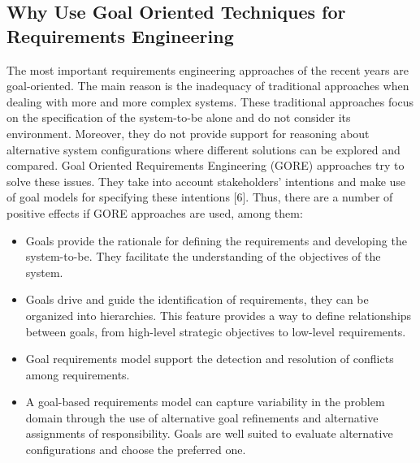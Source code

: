 \documentclass[10pt, conference, compsocconf]{IEEEtran}
\def\kaos{\textsc{Kaos}}
\begin{document}
\subsection{Why Use Goal Oriented Techniques for Requirements Engineering}

The most important requirements engineering approaches of the recent years are goal-oriented. The main reason is the inadequacy of traditional approaches when dealing with more and more complex systems. These traditional approaches focus on the specification of the system-to-be alone and do not consider its environment. Moreover, they do not provide support for reasoning about alternative system configurations where different solutions can be explored and compared. Goal Oriented Requirements Engineering (GORE) approaches try to solve these issues. They take into account stakeholders' intentions and make use of goal models for specifying these intentions [6]. Thus, there are a number of positive effects if GORE approaches are used, among them:

\begin{itemize}
\item Goals provide the rationale for defining the requirements and developing the system-to-be. They facilitate the understanding of the objectives of the system.
\item Goals drive and guide the identification of requirements, they can be organized into hierarchies. This feature provides a way to define relationships between goals, from high-level strategic objectives to low-level requirements.
\item Goal requirements model support the detection and resolution of conflicts among requirements.
\item A goal-based requirements model can capture variability in the problem domain through the use of alternative goal refinements and alternative assignments of responsibility. Goals are well suited to evaluate alternative configurations and choose the preferred one.
\end{itemize}

\end{document}

